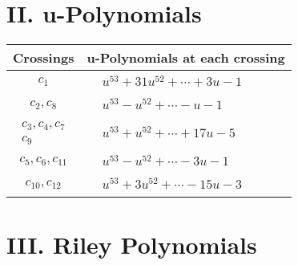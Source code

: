 \documentclass[1p]{elsarticle_modified}
\theoremstyle{definition}
\begin{document}
\newpage\renewcommand{\arraystretch}{1}
\centering \section*{ II. u-Polynomials}
\begin{tabular}{m{50pt}|m{274pt}}
Crossings & \hspace{64pt}u-Polynomials at each crossing \\
\hline $$\begin{aligned}c_{1}\end{aligned}$$&$\begin{aligned}
&u^{53}+31 u^{52}+\cdots+3 u-1
\end{aligned}$\\
\hline $$\begin{aligned}c_{2},c_{8}\end{aligned}$$&$\begin{aligned}
&u^{53}- u^{52}+\cdots- u-1
\end{aligned}$\\
\hline $$\begin{aligned}c_{3},c_{4},c_{7}\\c_{9}\end{aligned}$$&$\begin{aligned}
&u^{53}+u^{52}+\cdots+17 u-5
\end{aligned}$\\
\hline $$\begin{aligned}c_{5},c_{6},c_{11}\end{aligned}$$&$\begin{aligned}
&u^{53}- u^{52}+\cdots-3 u-1
\end{aligned}$\\
\hline $$\begin{aligned}c_{10},c_{12}\end{aligned}$$&$\begin{aligned}
&u^{53}+3 u^{52}+\cdots-15 u-3
\end{aligned}$\\
\hline
\end{tabular}\newpage\renewcommand{\arraystretch}{1}
\centering \section*{ III. Riley Polynomials}
\end{document}
